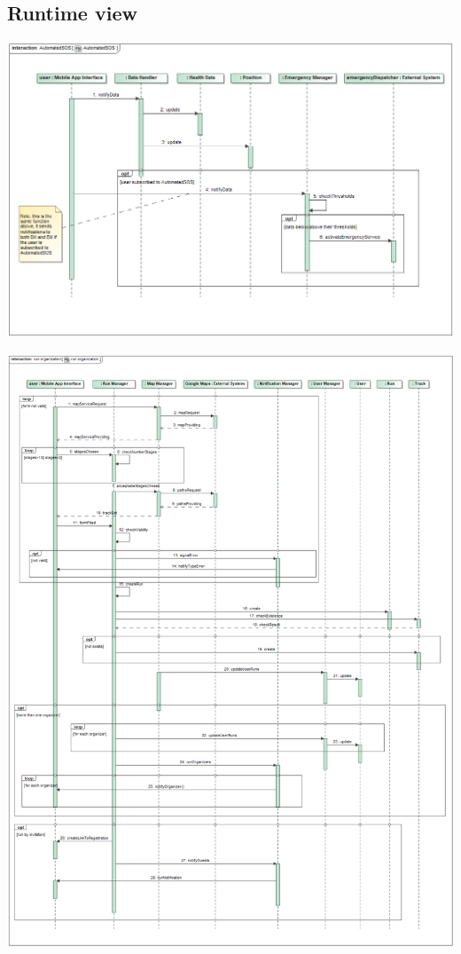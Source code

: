 \subsection{Runtime view}

\begin{center}
\includegraphics[scale=0.4]{sections/diagrams/AutomatedSOS}
\end{center}

\begin{center}
\includegraphics[scale=0.35]{sections/diagrams/run_organization}
\end{center}

%